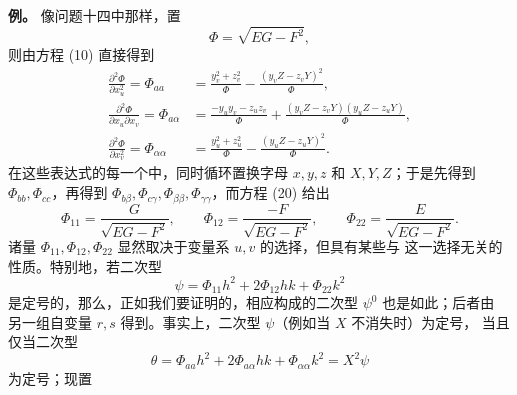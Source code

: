 \documentclass[11pt,a4paper,leqno]{article}
\begin{document}
\textbf{例。} 像问题十四中那样，置
\[
\Phi=\sqrt{EG-F^2},
\]
则由方程 (10) 直接得到
\[
\begin{aligned}
\frac{\partial^2\Phi}{\partial x_u^2}=\Phi_{aa}
&=\frac{y_v^2+z_v^2}{\Phi}
-\frac{(y_vZ-z_vY)^2}{\Phi},\\
\frac{\partial^2\Phi}{\partial x_u\partial x_v}=\Phi_{a\alpha}
&=\frac{-y_uy_v-z_uz_v}{\Phi}
+\frac{(y_vZ-z_vY)(y_uZ-z_uY)}{\Phi},\\
\frac{\partial^2\Phi}{\partial x_v^2}=\Phi_{\alpha\alpha}
&=\frac{y_u^2+z_u^2}{\Phi}
-\frac{(y_uZ-z_uY)^2}{\Phi}.
\end{aligned}
\]
在这些表达式的每一个中，同时循环置换字母 $x,y,z$ 和 $X,Y,Z$；于是先得到
$\Phi_{bb},\Phi_{cc}$，再得到
$\Phi_{b\beta},\Phi_{c\gamma},\Phi_{\beta\beta},\Phi_{\gamma\gamma}$，而方程 (20) 给出
\[
\Phi_{11}=\frac{G}{\sqrt{EG-F^2}},\qquad
\Phi_{12}=\frac{-F}{\sqrt{EG-F^2}},\qquad
\Phi_{22}=\frac{E}{\sqrt{EG-F^2}}.
\]
诸量 $\Phi_{11},\Phi_{12},\Phi_{22}$ 显然取决于变量系 $u,v$ 的选择，但具有某些与
这一选择无关的性质。特别地，若二次型
\[
\psi=\Phi_{11}h^2+2\Phi_{12}hk+\Phi_{22}k^2
\]
是定号的，那么，正如我们要证明的，相应构成的二次型 $\psi^0$ 也是如此；后者由
另一组自变量 $r,s$ 得到。事实上，二次型 $\psi$（例如当 $X$ 不消失时）为定号，
当且仅当二次型
\[
\theta=\Phi_{aa}h^2+2\Phi_{a\alpha}hk+\Phi_{\alpha\alpha}k^2=X^2\psi
\]
为定号；现置
\end{document}
